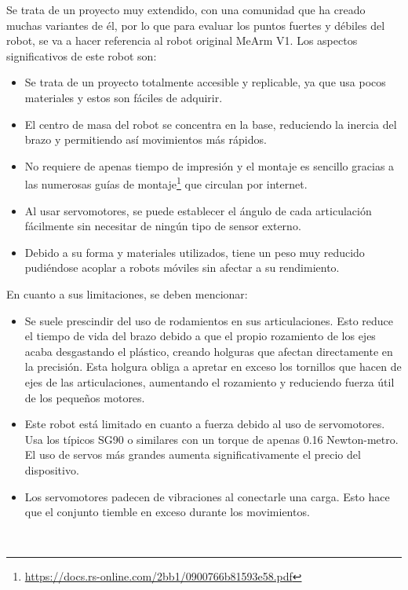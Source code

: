 \begin{itemize}
    Se trata de un proyecto muy extendido, con una comunidad que ha creado muchas variantes de él, por lo que para evaluar los puntos fuertes y 
    débiles del robot, se va a hacer referencia al robot original MeArm V1.
    Los aspectos significativos de este robot son:
    \begin{itemize}
        \item Se trata de un proyecto totalmente accesible y replicable, ya que usa pocos materiales y estos son fáciles de adquirir.
        \item El centro de masa del robot se concentra en la base, reduciendo la inercia del brazo y permitiendo así movimientos más rápidos.
        \item No requiere de apenas tiempo de impresión y el montaje es sencillo gracias a las numerosas guías de 
        montaje\footnote{\url{https://docs.rs-online.com/2bb1/0900766b81593e58.pdf}} que circulan por internet.
        \item Al usar servomotores, se puede establecer el ángulo de cada articulación fácilmente sin necesitar de ningún tipo de sensor externo.
        \item Debido a su forma y materiales utilizados, tiene un peso muy reducido pudiéndose acoplar a robots móviles sin afectar a 
        su rendimiento.
    \end{itemize}
    En cuanto a sus limitaciones, se deben mencionar:
    \begin{itemize}
    \item Se suele prescindir del uso de rodamientos en sus articulaciones. Esto reduce el tiempo de vida del brazo debido a que el propio rozamiento 
    de los ejes acaba desgastando el plástico, creando holguras que afectan directamente en la precisión. Esta holgura obliga a apretar en exceso los tornillos 
    que hacen de ejes de las articulaciones, aumentando el rozamiento y reduciendo fuerza útil de los pequeños motores.
    \item Este robot está limitado en cuanto a fuerza debido al uso de servomotores. Usa los típicos SG90 o similares con un torque de apenas 
    0.16 Newton-metro. El uso de servos más grandes aumenta significativamente el precio del dispositivo. 
    \item Los servomotores padecen de vibraciones al conectarle una carga. Esto hace que el conjunto tiemble en exceso durante los movimientos.
    \end{itemize}
\end{itemize}\
\vspace{1cm}
